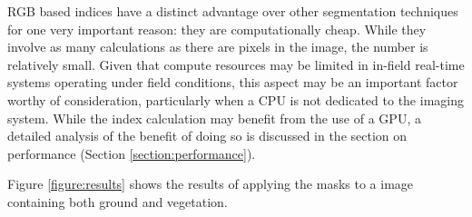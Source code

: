 \documentclass[letterpaper]{report}
\begin{document}
{RGB based indices have a distinct advantage over other segmentation techniques for one very important reason: they are computationally cheap. While they involve as many calculations as there are pixels in the image, the number is relatively small. Given that compute resources may be limited in in-field real-time systems operating under field conditions, this aspect may be an important factor worthy of consideration, particularly when a CPU is not dedicated to the imaging system. While the index calculation may benefit from the use of  a GPU, a detailed analysis of the benefit of doing so is discussed in the section on performance (Section \ref{section:performance}).

Figure \ref{figure:results} shows the results of applying the masks to a image containing both ground and vegetation.

}
\end{document}
